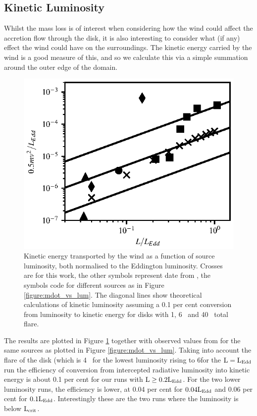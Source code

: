 \documentclass[a4paper,fleqn,usenatbib]{mnras}
\begin{document}
\subsection{Kinetic Luminosity}

Whilst the mass loss is of interest when considering how the wind could affect the 
accretion flow through the disk, it is also interesting to consider what (if any) effect the
wind could have on the surroundings. The kinetic energy carried by the wind is a
good measure of this, and so we calculate this via a simple summation around the outer
edge of the domain. 

\begin{figure}
\includegraphics[width=\columnwidth]{figures/lum_vs_ke_ponti.eps}
\caption{Kinetic energy transported by the wind  as a function of source luminosity, both
normalised to the Eddington luminosity. Crosses are for this work, the other symbols represent
date from
\protect\cite{2016AN....337..512P}, the symbols code for different sources as in Figure \ref{figure:mdot_vs_lum}.
The diagonal lines show theoretical calculations of kinetic luminosity assuming a 0.1 per cent conversion
from luminosity to kinetic energy for disks with 1\degree, 6\degree~ and 40\degree~ total flare.}
\label{figure:ke_vs_lum}
\end{figure}

The results are plotted in Figure \ref{figure:ke_vs_lum} together with observed values from
\cite{2016AN....337..512P} for the same sources as plotted in Figure \ref{figure:mdot_vs_lum}. 
Taking into account the flare of the disk (which is 4\degree~ for the lowest luminosity rising to 6\degree for
the $\rm{L=L_{Edd}}$ run the efficiency of conversion from intercepted radiative luminosity into kinetic 
energy is about 0.1 per cent for our runs with $\rm{L \geq 0.2L_{Edd}}$. For the two lower luminosity runs,
the efficiency is lower, at 0.04 per cent for $\rm{0.04L_{Edd}}$ and 0.06 per cent for $\rm{0.1L_{Edd}}$.
Interestingly these are the two runs where the luminosity is below $\rm{L_{crit}}$.
\end{document}

